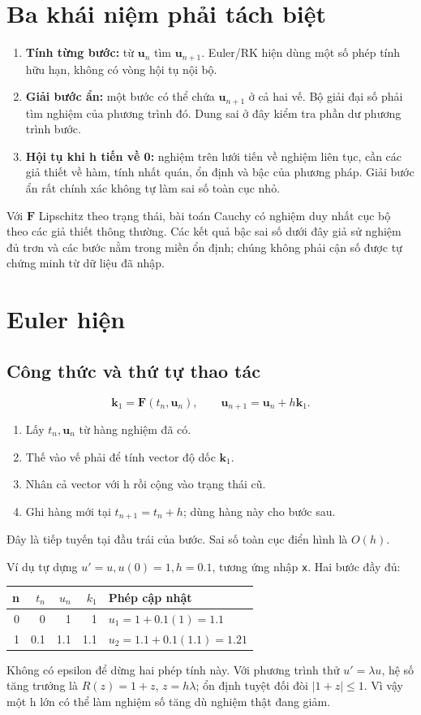 \section{Ba khái niệm phải tách biệt}
\begin{enumerate}
\item \textbf{Tính từng bước:} từ $\mathbf u_n$ tìm $\mathbf u_{n+1}$. Euler/RK hiện dùng một số phép tính hữu hạn, không có vòng hội tụ nội bộ.
\item \textbf{Giải bước ẩn:} một bước có thể chứa $\mathbf u_{n+1}$ ở cả hai vế. Bộ giải đại số phải tìm nghiệm của phương trình đó. Dung sai ở đây kiểm tra phần dư phương trình bước.
\item \textbf{Hội tụ khi h tiến về 0:} nghiệm trên lưới tiến về nghiệm liên tục, cần các giả thiết về hàm, tính nhất quán, ổn định và bậc của phương pháp. Giải bước ẩn rất chính xác không tự làm sai số toàn cục nhỏ.
\end{enumerate}
Với $\mathbf F$ Lipschitz theo trạng thái, bài toán Cauchy có nghiệm duy nhất cục bộ theo các giả thiết thông thường. Các kết quả bậc sai số dưới đây giả sử nghiệm đủ trơn và các bước nằm trong miền ổn định; chúng không phải cận số được tự chứng minh từ dữ liệu đã nhập.

\section{Euler hiện}
\label{sec:ode-euler-explicit}
\subsection{Công thức và thứ tự thao tác}
\[
\mathbf k_1=\mathbf F(t_n,\mathbf u_n),\qquad
\mathbf u_{n+1}=\mathbf u_n+h\mathbf k_1.
\]
\begin{enumerate}
\item Lấy $t_n,\mathbf u_n$ từ hàng nghiệm đã có.
\item Thế vào vế phải để tính vector độ dốc $\mathbf k_1$.
\item Nhân cả vector với h rồi cộng vào trạng thái cũ.
\item Ghi hàng mới tại $t_{n+1}=t_n+h$; dùng hàng này cho bước sau.
\end{enumerate}
Đây là tiếp tuyến tại đầu trái của bước. Sai số toàn cục điển hình là $O(h)$.

Ví dụ tự dựng $u'=u,u(0)=1,h=0.1$, tương ứng nhập \texttt{x}. Hai bước đầy đủ:
\begin{center}\begin{tabular}{rrrrl}
\toprule n&$t_n$&$u_n$&$k_1$&Phép cập nhật\\\midrule
0&0&1&1&$u_1=1+0.1(1)=1.1$\\
1&0.1&1.1&1.1&$u_2=1.1+0.1(1.1)=1.21$\\\bottomrule
\end{tabular}\end{center}
Không có epsilon để dừng hai phép tính này. Với phương trình thử $u'=\lambda u$, hệ số tăng trưởng là $R(z)=1+z$, $z=h\lambda$; ổn định tuyệt đối đòi $|1+z|\le1$. Vì vậy một h lớn có thể làm nghiệm số tăng dù nghiệm thật đang giảm.

